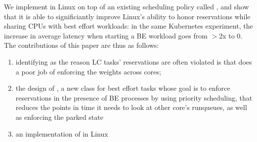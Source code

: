 We implement \beclass{} in Linux on top of an existing scheduling policy called
\schedidle{}, and show that it is able to significiantly improve Linux's ability
to honor reservations while sharing CPUs with best effort workloads: in the same
Kubernetes experiment, the increase in average latency when starting a BE
workload goes from $>$2x to 0. The contributions of this paper are thus as
follows: 
\begin{enumerate}
    \item identifying as the reason LC tasks' reservations are often violated is
    that \cgroups{} does a poor job of enforcing the weights across cores;
    \item the design of \beclass{}, a new class for best effort tasks whose goal
    is to enforce reservations in the presence of BE processes by using priority
    scheduling, that reduces the points in time it needs to look at other core's
    runqueues, as well as enforcing the parked state
    \item an implementation of \beclass{} in Linux
\end{enumerate}
